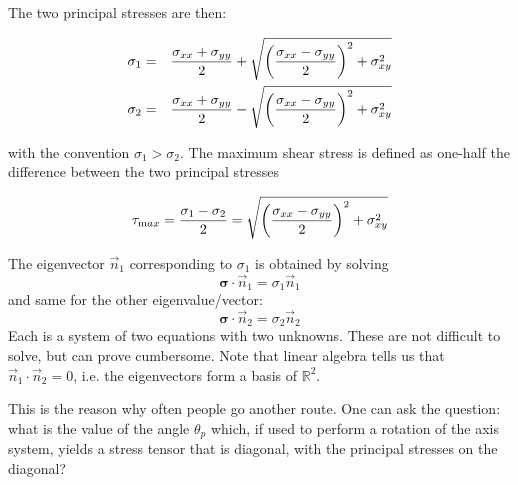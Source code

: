 The two principal stresses are then:
\begin{mdframed}[backgroundcolor=blue!5]
\begin{eqnarray}
\sigma_1 &=& \frac{ \sigma_{xx}+\sigma_{yy}}{2} 
+ \sqrt{ \left(\frac{\sigma_{xx}-\sigma_{yy}}{2}\right)^2 +\sigma_{xy}^2 } \nonumber\\
\sigma_2 &=& \frac{ \sigma_{xx}+\sigma_{yy}}{2} 
- \sqrt{ \left(\frac{\sigma_{xx}-\sigma_{yy}}{2}\right)^2 +\sigma_{xy}^2 } \label{eq:princ_stress_2D} 
\end{eqnarray}
\end{mdframed}
with the convention $\sigma_1>\sigma_2$.
The maximum shear stress is defined as one-half the difference between the two principal 
stresses 
\begin{mdframed}[backgroundcolor=blue!5]
\begin{equation}
\tau_{\text max}=
\frac{\sigma_1-\sigma_2}{2}
=\sqrt{ \left(\frac{\sigma_{xx}-\sigma_{yy}}{2}\right)^2 +\sigma_{xy}^2 }
\label{eq:max_shear_stress_2D} 
\end{equation}
\end{mdframed}
The eigenvector $\vec{n}_1$ corresponding to $\sigma_1$ is obtained by solving 
\[
{\bm \sigma}\!\cdot\! \vec{n}_1 = \sigma_1 \vec{n}_1
\]
and same for the other eigenvalue/vector:
\[
{\bm \sigma} \!\cdot\! \vec{n}_2 = \sigma_2 \vec{n}_2
\]
Each is a system of two equations with two unknowns. These are not difficult to solve, 
but can prove cumbersome. Note that linear algebra tells us that $\vec{n}_1\cdot\vec{n}_2=0$, 
i.e. the eigenvectors form a basis of $\mathbb{R}^2$.

This is the reason why often people go another route. One can ask the question: what is the 
value of the angle $\theta_p$ which, if used to perform a rotation of the axis system, yields 
a stress tensor that is diagonal, with the principal stresses on the diagonal?
 
